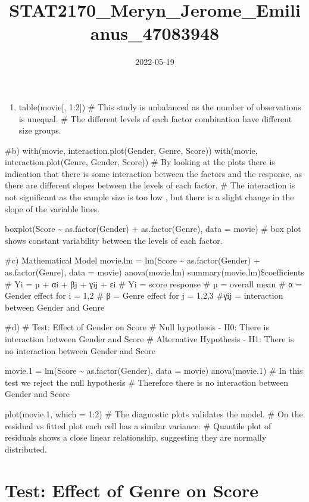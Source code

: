 \documentclass[
]{article}
\title{STAT2170\_Meryn\_Jerome\_Emilianus\_47083948}
\author{}
\date{\vspace{-2.5em}2022-05-19}
\providecommand{\tightlist}{%
  \setlength{\itemsep}{0pt}\setlength{\parskip}{0pt}}
\begin{document}
\maketitle

\begin{enumerate}
\def\labelenumi{\alph{enumi})}
\tightlist
\item
  table(movie{[}, 1:2{]}) \# This study is unbalanced as the number of
  observations is unequal. \# The different levels of each factor
  combination have different size groups.
\end{enumerate}

\#b) with(movie, interaction.plot(Gender, Genre, Score)) with(movie,
interaction.plot(Genre, Gender, Score)) \# By looking at the plots there
is indication that there is some interaction between the factors and the
response, as there are different slopes between the levels of each
factor. \# The interaction is not significant as the sample size is too
low , but there is a slight change in the slope of the variable lines.

boxplot(Score \textasciitilde{} as.factor(Gender) + as.factor(Genre),
data = movie) \# box plot shows constant variability between the levels
of each factor.

\#c) Mathematical Model movie.lm = lm(Score \textasciitilde{}
as.factor(Gender) + as.factor(Genre), data = movie) anova(movie.lm)
summary(movie.lm)\$coefficients \# Yi = µ + αi + βj + γij + εi \# Yi =
score response \# µ = overall mean \# α = Gender effect for i = 1,2 \# β
= Genre effect for j = 1,2,3 \#γij = interaction between Gender and
Genre

\#d) \# Test: Effect of Gender on Score \# Null hypothesis - H0: There
is interaction between Gender and Score \# Alternative Hypothesis - H1:
There is no interaction between Gender and Score

movie.1 = lm(Score \textasciitilde{} as.factor(Gender), data = movie)
anova(movie.1) \# In this test we reject the null hypothesis \#
Therefore there is no interaction between Gender and Score

plot(movie.1, which = 1:2) \# The diagnostic plots validates the model.
\# On the residual vs fitted plot each cell has a similar variance. \#
Quantile plot of residuals shows a close linear relationship, suggesting
they are normally distributed.

\hypertarget{test-effect-of-genre-on-score}{%
\section{Test: Effect of Genre on
Score}\label{test-effect-of-genre-on-score}}
\end{document}
